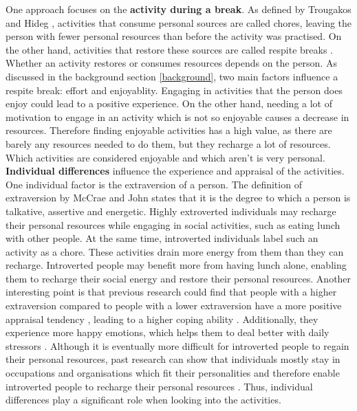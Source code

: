 \documentclass{hasel_thesis}
\begin{document}
One approach focuses on the \textbf{activity during a break}. As defined by Trougakos and Hideg \cite{Trougakos.2009}, activities that consume personal sources are called chores, leaving the person with fewer personal resources than before the activity was practised. On the other hand, activities that restore these sources are called respite breaks \cite{Trougakos.2009}. Whether an activity restores or consumes resources depends on the person.
As discussed in the background section \ref{background}, two main factors influence a respite break: effort and enjoyablity\cite{Trougakos.2009}. Engaging in activities that the person does enjoy could lead to a positive experience. On the other hand, needing a lot of motivation to engage in an activity which is not so enjoyable causes a decrease in resources. Therefore finding enjoyable activities has a high value, as there are barely any resources needed to do them, but they recharge a lot of resources. Which activities are considered enjoyable and which aren't is very personal.
\textbf{Individual differences} influence the experience and appraisal of the activities. One individual factor is the extraversion of a person. The definition of extraversion by McCrae and John \cite{McCrae.1992} states that it is the degree to which a person is talkative, assertive and energetic. Highly extroverted individuals may recharge their personal resources while engaging in social activities, such as eating lunch with other people. At the same time, introverted individuals label such an activity as a chore. These activities drain more energy from them than they can recharge. Introverted people may benefit more from having lunch alone, enabling them to recharge their social energy and restore their personal resources. Another interesting point is that previous research could find that people with a higher extraversion compared to people with a lower extraversion have a more positive appraisal tendency \cite{Gallagher.1990, Hemenover.1996}, leading to a higher coping ability \cite{Penley.2002}. Additionally, they experience more happy emotions, which helps them to deal better with daily stressors \cite{Gallagher.1990}. Although it is eventually more difficult for introverted people to regain their personal resources, past research can show that individuals mostly stay in occupations and organisations which fit their personalities and therefore enable introverted people to recharge their personal resources \cite{Johansson.1970, Schaubroeck.1998}. Thus, individual differences play a significant role when looking into the activities.
\end{document}
